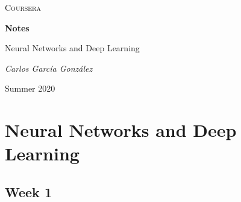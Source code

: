 \documentclass[11pt]{report}
\makeatletter
\renewcommand\tableofcontents{
  \null\hfill\textbf{\Large\contentsname}\hfill\null\par
  \@mkboth{\MakeUppercase\contentsname}{\MakeUppercase\contentsname}
  \@starttoc{toc}
}
\makeatother
\begin{document}
\begin{titlepage}
	\centering
	{\scshape\LARGE Coursera \par}
	\vspace{6.5cm}
	{\LARGE \textbf{Notes}\par}
	{\LARGE Neural Networks and Deep Learning \par}
	\vfill
	{\Large\itshape Carlos Garc\'ia Gonz\'alez\par}
	\vspace{1cm}
	{\large Summer 2020 \par}
\end{titlepage}

\tableofcontents
{}
\newpage
\chapter{Neural Networks and Deep Learning}

\section{Week 1}
\end{document}

